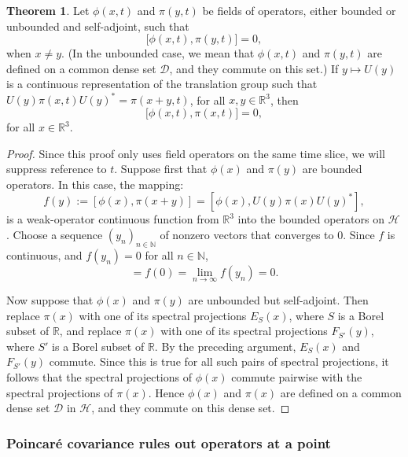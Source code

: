 \documentclass[11pt]{article}
\theoremstyle{definition}
\newtheorem{thm}{Theorem}[section]
\theoremstyle{definition}
\newcommand{\mb}[1]{#1}
\theoremstyle{remark}
\def\2#1{{\mathcal #1}}
\def\7#1{{\mathbb #1}}
\begin{document}
\begin{thm} Let $\phi (x,t)$ and $\pi (y,t)$ be fields of operators, either bounded
  or unbounded and self-adjoint, such that
  \[ {[}\phi (x,t),\pi (y,t){]}=0 ,\] when $\mb{x}\neq y$.  (In the
  unbounded case, we mean that $\phi (x,t)$ and $\pi (y,t)$ are defined on a common
  dense set $\2D$, and they commute on this set.)  If $y\mapsto U(y)$ is a continuous
  representation of the translation group such that $U(y)\pi (x,t)U(y)^*=\pi
  (x+y,t)$, for all $x,y\in \mathbb{R}^{3}$, then
  \[ {[}\phi (x,t),\pi (x,t){]}=0 ,\] for all
  $\mb{x}\in \mathbb{R}^{3}$. \end{thm}

\begin{proof} Since this proof only uses field operators on the same time slice, we
  will suppress reference to $t$.  Suppose first that $\phi (x)$ and $\pi (y)$ are
  bounded operators.  In this case, the mapping:
  \begin{equation} f(y):=[\phi (x),\pi (x+y)]=[\phi (x),U(y)\pi (x)U(y)^*]
    ,\end{equation} is a weak-operator continuous function from $\mathbb{R}^{3}$ into
  the bounded operators on $\2H$.  Choose a sequence $(y_n)_{n\in \7N}$ of nonzero
  vectors that converges to $0$.  Since $f$ is continuous, and $f(y _n )=0$ for all
  $n\in \mathbb{N}$,
  \begin{equation} [\phi (x),\pi (x)]=f(0)=\lim _{n\rightarrow \infty}f(y_n )=0
    .\end{equation}

  Now suppose that $\phi (x)$ and $\pi (y)$ are unbounded but self-adjoint.  Then
  replace $\pi (x)$ with one of its spectral projections $E_S(x)$, where $S$ is a
  Borel subset of $\7R$, and replace $\pi (x)$ with one of its spectral projections
  $F_{S'}(y)$, where $S'$ is a Borel subset of $\7R$.  By the preceding argument,
  $E_S(x)$ and $F_{S'}(y)$ commute.  Since this is true for all such pairs of
  spectral projections, it follows that the spectral projections of $\phi (x)$
  commute pairwise with the spectral projections of $\pi (x)$.  Hence $\phi (x)$ and
  $\pi (x)$ are defined on a common dense set $\2D$ in $\2H$, and they commute on
  this dense set.
\end{proof}

\subsubsection{Poincar{\'e} covariance rules out operators at a point}
\end{document}
